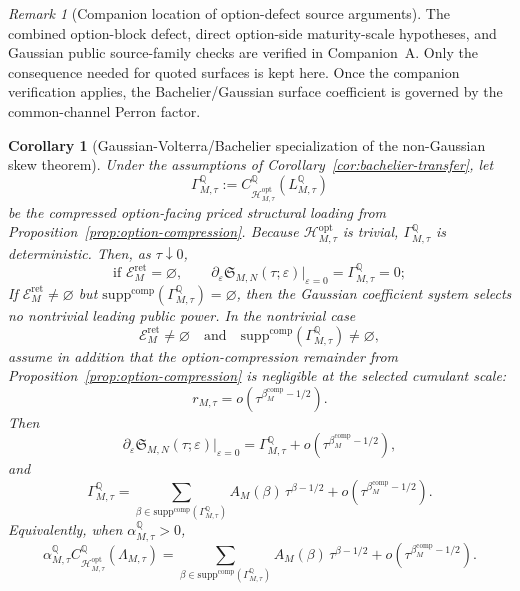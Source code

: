 \documentclass[11pt,a4paper]{amsart}
\theoremstyle{plain}
\newtheorem{corollary}[theorem]{Corollary}
\theoremstyle{definition}
\theoremstyle{remark}
\newtheorem{remark}[theorem]{Remark}
\newcommand{\QQ}{\mathbb{Q}}
\newcommand{\cH}{\mathcal{H}}
\newcommand{\cE}{\mathcal{E}}
\begin{document}
\begin{remark}[Companion location of option-defect source arguments]\label{rem:gaussian-option-defect-companion}
The combined option-block defect, direct option-side maturity-scale hypotheses, and Gaussian public
source-family checks are verified in Companion~A.  Only the consequence needed for quoted
surfaces is kept here.  Once the companion verification applies, the Bachelier/Gaussian
surface coefficient is governed by the common-channel Perron factor.
\end{remark}

\begin{corollary}[Gaussian-Volterra/Bachelier specialization of the non-Gaussian skew theorem]\label{cor:gaussian-market-skew}
Under the assumptions of Corollary~\ref{cor:bachelier-transfer}, let
\[
        \Gamma_{M,\tau}^\QQ
        :=
        C_{\cH_{M,\tau}^{\mathrm{opt}}}^\QQ(L_{M,\tau}^\QQ)
\]
be the compressed option-facing priced structural loading from
Proposition~\ref{prop:option-compression}.  Because
\(\cH_{M,\tau}^{\mathrm{opt}}\) is trivial, \(\Gamma_{M,\tau}^\QQ\) is deterministic.  Then, as
\(\tau\downarrow0\),
\[
        \text{if }\cE_M^{\mathrm{ret}}=\varnothing,
        \qquad
        \partial_\varepsilon
        \mathfrak S_{M,N}(\tau;\varepsilon)\big|_{\varepsilon=0}
        =
        \Gamma_{M,\tau}^\QQ
        =
        0;
\]
If \(\cE_M^{\mathrm{ret}}\neq\varnothing\) but
\(\mathrm{supp}^{\mathrm{comp}}(\Gamma_{M,\tau}^\QQ)=\varnothing\), then the Gaussian coefficient
system selects no nontrivial leading public power.  In the nontrivial case
\[
        \cE_M^{\mathrm{ret}}\neq\varnothing
        \quad\text{and}\quad
        \mathrm{supp}^{\mathrm{comp}}(\Gamma_{M,\tau}^\QQ)\neq\varnothing,
\]
assume in addition that the option-compression remainder from
Proposition~\ref{prop:option-compression} is negligible at the selected cumulant scale:
\[
        r_{M,\tau}=o\!\left(\tau^{\beta_M^{\mathrm{comp}}-1/2}\right).
\]
Then
\[
        \partial_\varepsilon
        \mathfrak S_{M,N}(\tau;\varepsilon)\big|_{\varepsilon=0}
        =
        \Gamma_{M,\tau}^\QQ
        +
        o\!\left(\tau^{\beta_M^{\mathrm{comp}}-1/2}\right),
\]
and
\[
        \Gamma_{M,\tau}^\QQ
        =
        \sum_{\beta\in\mathrm{supp}^{\mathrm{comp}}(\Gamma_{M,\tau}^\QQ)}
        A_M(\beta)\,\tau^{\beta-1/2}
        +
        o\!\left(\tau^{\beta_M^{\mathrm{comp}}-1/2}\right).
\]
Equivalently, when \(\alpha_{M,\tau}^\QQ>0\),
\[
        \alpha_{M,\tau}^\QQ
        C_{\cH_{M,\tau}^{\mathrm{opt}}}^\QQ(\Lambda_{M,\tau})
        =
        \sum_{\beta\in\mathrm{supp}^{\mathrm{comp}}(\Gamma_{M,\tau}^\QQ)}
        A_M(\beta)\,\tau^{\beta-1/2}
        +
        o\!\left(\tau^{\beta_M^{\mathrm{comp}}-1/2}\right).
\]
\end{corollary}
\end{document}
